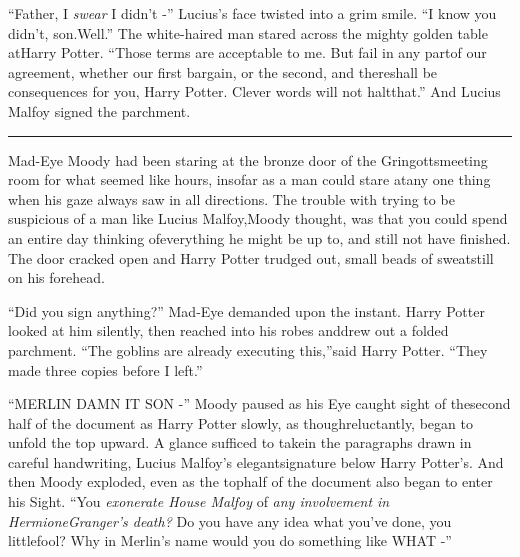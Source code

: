 ``Father, I \emph{swear} I didn't -''
Lucius's face twisted into a grim smile. ``I know you didn't, son.Well.'' The white-haired man stared across the mighty golden table atHarry Potter. ``Those terms are acceptable to me. But fail in any partof our agreement, whether our first bargain, or the second, and thereshall be consequences for you, Harry Potter. Clever words will not haltthat.''
And Lucius Malfoy signed the parchment.

\begin{center}\rule{3in}{0.4pt}\end{center}
Mad-Eye Moody had been staring at the bronze door of the Gringottsmeeting room for what seemed like hours, insofar as a man could stare atany one thing when his gaze always saw in all directions.
The trouble with trying to be suspicious of a man like Lucius Malfoy,Moody thought, was that you could spend an entire day thinking ofeverything he might be up to, and still not have finished.
The door cracked open and Harry Potter trudged out, small beads of sweatstill on his forehead.

``Did you sign anything?'' Mad-Eye demanded upon the instant.
Harry Potter looked at him silently, then reached into his robes anddrew out a folded parchment. ``The goblins are already executing this,''said Harry Potter. ``They made three copies before I left.''

``MERLIN DAMN IT SON -'' Moody paused as his Eye caught sight of thesecond half of the document as Harry Potter slowly, as thoughreluctantly, began to unfold the top upward. A glance sufficed to takein the paragraphs drawn in careful handwriting, Lucius Malfoy's elegantsignature below Harry Potter's. And then Moody exploded, even as the tophalf of the document also began to enter his Sight. ``You
\emph{exonerate House Malfoy} of \emph{any involvement in HermioneGranger's death?} Do you have any idea what you've done, you littlefool? Why in Merlin's name would you do something like WHAT -''